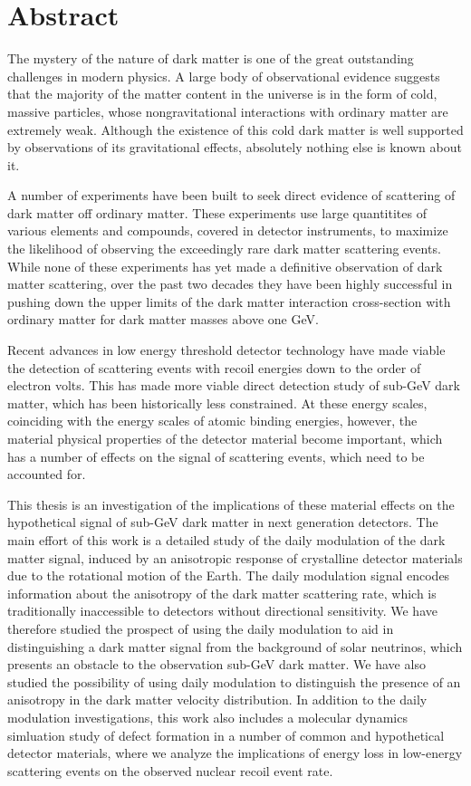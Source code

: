 \documentclass[b5paper, 10pt, twoside]{book}
\begin{document}
\tableofcontents

\chapter{Abstract}

The mystery of the nature of dark matter is one of the great outstanding challenges in modern physics. A large body of observational evidence suggests that the majority of the matter content in the universe is in the form of cold, massive particles, whose nongravitational interactions with ordinary matter are extremely weak. Although the existence of this cold dark matter is well supported by observations of its gravitational effects, absolutely nothing else is known about it.

A number of experiments have been built to seek direct evidence of scattering of dark matter off ordinary matter. These experiments use large quantitites of various elements and compounds, covered in detector instruments, to maximize the likelihood of observing the exceedingly rare dark matter scattering events. While none of these experiments has yet made a definitive observation of dark matter scattering, over the past two decades they have been highly successful in pushing down the upper limits of the dark matter interaction cross-section with ordinary matter for dark matter masses above one GeV.

Recent advances in low energy threshold detector technology have made viable the detection of scattering events with recoil energies down to the order of electron volts. This has made more viable direct detection study of sub-GeV dark matter, which has been historically less constrained. At these energy scales, coinciding with the energy scales of atomic binding energies, however, the material physical properties of the detector material become important, which has a number of effects on the signal of scattering events, which need to be accounted for.

This thesis is an investigation of the implications of these material effects on the hypothetical signal of sub-GeV dark matter in next generation detectors. The main effort of this work is a detailed study of the daily modulation of the dark matter signal, induced by an anisotropic response of crystalline detector materials due to the rotational motion of the Earth. The daily modulation signal encodes information about the anisotropy of the dark matter scattering rate, which is traditionally inaccessible to detectors without directional sensitivity. We have therefore studied the prospect of using the daily modulation to aid in distinguishing a dark matter signal from the background of solar neutrinos, which presents an obstacle to the observation sub-GeV dark matter. We have also studied the possibility of using daily modulation to distinguish the presence of an anisotropy in the dark matter velocity distribution. In addition to the daily modulation investigations, this work also includes a molecular dynamics simluation study of defect formation in a number of common and hypothetical detector materials, where we analyze the implications of energy loss in low-energy scattering events on the observed nuclear recoil event rate.
\end{document}
